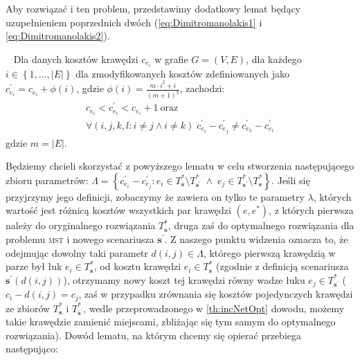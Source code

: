 {Aby rozwiązać i ten problem, przedstawimy dodatkowy lemat będący uzupełnieniem poprzednich dwóch (\ref{eq:Dimitromanolakis1} i \ref{eq:Dimitromanolakis2}).

\begin{lemma}~\cite{Dimitromanolakis02analysisof}\label{lm:Dimitromanolakis}
Dla danych kosztów krawędzi $c_{e_{i}}$ w grafie $G = \left( V, E \right)$, dla każdego $i \in \left\{ 1, \dots, \left| E \right| \right\}$ dla zmodyfikowanych kosztów zdefiniowanych jako $c^{\prime}_{e_{i}} = c_{e_{i}} + \phi \left( i \right)$, gdzie $\phi \left( i \right) = \frac{m \cdot i^{2} + i}{\left( m + 1 \right)^{3}}$, zachodzi:
\begin{gather}
	c_{e_{i}} < c^{\prime}_{e_{i}} < c_{e_{i}} + 1~\text{oraz}\label{eq:Dimitromanolakis3}\\
	\forall \left( i, j, k, l : i \neq j \wedge i \neq k \right) \; c^{\prime}_{e_{i}} - c^{\prime}_{e_{j}} \neq c^{\prime}_{e_{k}} - c^{\prime}_{e_{l}}\label{eq:Dimitromanolakis4}
\end{gather}
gdzie $m = \left| E \right|$.
\end{lemma}

Będziemy chcieli skorzystać z powyższego lematu w celu stworzenia następującego zbioru parametrów: $\Lambda = \left\{ c^{\prime}_{e_{i}} - c^{\prime}_{e_{j}} : e_{i} \in T^{\ast}_{\textbf{s}} \setminus T^{\ast}_{\textbf{s}^{\prime}} \; \wedge \; e_{j} \in T^{\ast}_{\textbf{s}^{\prime}} \setminus T^{\ast}_{\textbf{s}} \right\}$. Jeśli się przyjrzymy jego definicji, zobaczymy że zawiera on tylko te parametry $\lambda$, których wartość jest różnicą kosztów wszystkich par krawędzi $\left( e, e^{\ast} \right)$, z których pierwsza należy do oryginalnego rozwiązania $T^{\ast}_{\textbf{s}}$, druga zaś do optymalnego rozwiązania dla problemu \textsc{mst} i nowego scenariusza $\textbf{s}^{\prime}$. Z naszego punktu widzenia oznacza to, że odejmując dowolny taki parametr $d \left( i, j \right) \in \Lambda$, którego pierwszą krawędzią w parze był łuk $e_{i} \in T^{\ast}_{\textbf{s}}$, od kosztu krawędzi $e_{i} \in T^{\ast}_{\textbf{s}}$ (zgodnie z definicją scenariusza $\textbf{s}^{\prime} \left( d \left( i, j \right) \right)$), otrzymamy nowy koszt tej krawędzi równy wadze łuku $e_{j} \in T^{\ast}_{\textbf{s}^{\prime}}$ ($c_{i} - d \left( i, j \right) = c_{j}$, zaś w przypadku zrównania się kosztów pojedynczych krawędzi ze zbiorów $T^{\ast}_{\textbf{s}}$ i $T^{\ast}_{\textbf{s}^{\prime}}$, wedle przeprowadzonego w \ref{th:incNetOpt} dowodu, możemy takie krawędzie zamienić miejscami, zbliżając się tym samym do optymalnego rozwiązania). Dowód lematu, na którym chcemy się opierać przebiega następująco:

}
